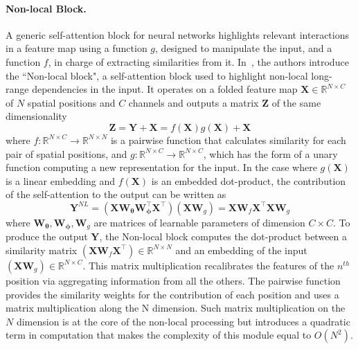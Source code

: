 \documentclass[10pt,twocolumn,letterpaper]{article}
\begin{document}
\paragraph{Non-local Block.}{A generic self-attention block for neural networks highlights relevant interactions in a feature map using a function $g$, designed to manipulate the input, and a function $f$, in charge of extracting similarities from it. In~\cite{wang2018non}, the authors introduce the ``Non-local block", a self-attention block used to highlight non-local long-range dependencies in the input. It operates on a folded feature map $\mathbf{X} \in \mathbb{R}^{N \times C}$ of $N$ spatial positions and $C$ channels and outputs a matrix $\mathbf{Z}$ of the same dimensionality 
\begin{equation}
   \mathbf{Z} = \mathbf{Y} + \mathbf{X}= f(\mathbf{X})g(\mathbf{X}) + \mathbf{X}
   \label{eqn:sa}
\end{equation}
  where  $f\colon\mathbb{R}^{N \times C} \to \mathbb{R}^{N \times N}$ is a pairwise function that calculates similarity for each pair of spatial positions, and $g\colon\mathbb{R}^{N \times C} \to \mathbb{R}^{N \times C}$, which has the form of a unary function computing a new representation for the input. In the case where $g(\mathbf{X})$ is a linear embedding and $f(\mathbf{X})$ is an embedded dot-product, the contribution of the self-attention to the output can be written as
\begin{equation}
    \mathbf{Y}^{NL} =
    (\mathbf{X}\mathbf{W_{\theta}\mathbf{W_{\phi}^{\top}}\mathbf{X}^{\top}})(\mathbf{X}\mathbf{W}_{g}) = \mathbf{X}\mathbf{W}_{f}\mathbf{X}^{\top}\mathbf{X}\mathbf{W}_{g}
    \label{eqn:nl1_matrix}
\end{equation}
where $\mathbf{W_{\theta}}, \mathbf{W_{\phi}}, \mathbf{W}_{g} $ are matrices of learnable parameters of dimension $C \times C$.
To produce the output $\mathbf{Y}$, the Non-local block computes the dot-product between a similarity matrix $(\mathbf{X}\mathbf{W}_{f}\mathbf{X}^{\top}) \in \mathbb{R}^{N \times N}$ and an embedding of the input $(\mathbf{X}\mathbf{W}_{g}) \in \mathbb{R}^{N \times C}$. This matrix multiplication recalibrates the features of the $n^{th}$ position via aggregating information from all the others. The pairwise function provides the similarity weights for the contribution of each position and uses a matrix multiplication along the N dimension. 
Such matrix multiplication on the $N$ dimension is at the core of the non-local processing but introduces a quadratic term in computation that makes the complexity of this module equal to $O(N^2)$.}
\vspace{-0.1cm}
\end{document}
